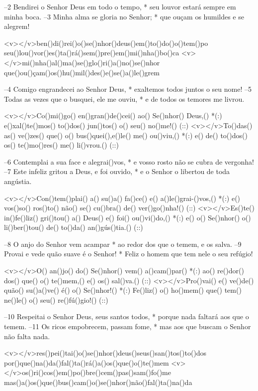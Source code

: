 –2 Bendirei o Senhor Deus em todo o tempo, *
seu louvor estará sempre em minha boca.
–3 Minha alma se gloria no Senhor; *
que ouçam os humildes e se alegrem!

<v></v>ben()di()rei()o()se()nhor()deus()em()to()do()o()tem()po
seu()lou()vor()es()ta()rá()sem()pre()em()mi()nha()bo()ca
<v></v>mi()nha()al()ma()se()glo()ri()a()no()se()nhor
que()ou()çam()os()hu()mil()des()e()se()a()le()grem

–4 Comigo engrandecei ao Senhor Deus, *
exaltemos todos juntos o seu nome!
–5 Todas as vezes que o busquei, ele me ouviu, *
e de todos os temores me livrou.

<v></v>Co()mi()go() en()gran()de()cei() ao() Se()nhor() Deus,() *(:)
e()xal()te()mos() to()dos() jun()tos() o() seu() no()me!() (::)
<v></v>To()das() as() ve()zes() que() o() bus()quei(),e()le() me() ou()viu,() *(:)
e() de() to()dos() os() te()mo()res() me() li()vrou.() (::)

–6 Contemplai a sua face e alegrai()vos, *
e vosso rosto não se cubra de vergonha!
–7 Este infeliz gritou a Deus, e foi ouvido, *
e o Senhor o libertou de toda angústia.

<v></v>Con()tem()plai() a() su()a() fa()ce() e() a()le()grai-()vos,() *(:)
e() vos()so() ros()to() não() se() cu()bra() de() ver()go()nha!() (::)
<v></v>Es()te() in()fe()liz() gri()tou() a() Deus() e() foi() ou()vi()do,() *(:)
e() o() Se()nhor() o() li()ber()tou() de() to()da() an()gús()tia.() (::)

–8 O anjo do Senhor vem acampar *
ao redor dos que o temem, e os salva.
–9 Provai e vede quão suave é o Senhor! *
Feliz o homem que tem nele o seu refúgio!

<v></v>O() an()jo() do() Se()nhor() vem() a()cam()par() *(:)
ao() re()dor() dos() que() o() te()mem,() e() os() sal()va.() (::)
<v></v>Pro()vai() e() ve()de() quão() su()a()ve() é() o() Se()nhor!() *(:)
Fe()liz() o() ho()mem() que() tem() ne()le() o() seu() re()fú()gio!() (::)

–10 Respeitai o Senhor Deus, seus santos todos, *
porque nada faltará aos que o temem.
–11 Os ricos empobrecem, passam fome, *
mas aos que buscam o Senhor não falta nada.

<v></v>res()pei()tai()o()se()nhor()deus()seus()san()tos()to()dos
por()que()na()da()fal()ta()rá()a()os()que()o()te()mem
<v></v>os()ri()cos()em()po()bre()cem()pas()sam()fo()me
mas()a()os()que()bus()cam()o()se()nhor()não()fal()ta()na()da

